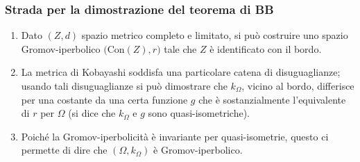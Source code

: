 \begin{frame}
  \frametitle{Strada per la dimostrazione del teorema di BB}
  \begin{enumerate}
    \item Dato $(Z,d)$ spazio metrico completo e limitato, si può costruire uno spazio Gromov-iperbolico $\big(\text{Con}(Z),r\big)$ tale che $Z$ è identificato con il bordo.
    \pause
    \item La metrica di Kobayashi soddisfa una particolare catena di disuguaglianze; \pause usando tali disuguaglianze si può dimostrare che $k_{\Omega}$, vicino al bordo, differisce per una costante da una certa funzione $g$ che è sostanzialmente l'equivalente di $r$ per $\Omega$ (si dice che $k_{\Omega}$ e $g$ sono quasi-isometriche).
    \pause
    \item Poiché la Gromov-iperbolicità è invariante per quasi-isometrie, questo ci permette di dire che $(\Omega,k_{\Omega})$ è Gromov-iperbolico.
  \end{enumerate}
\end{frame}

